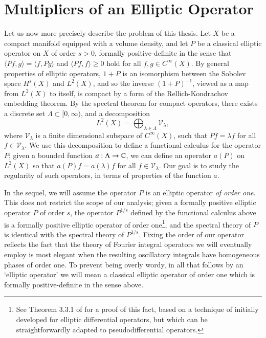 
\chapter{Multipliers of an Elliptic Operator} \label{cha:multipliers_of_an_elliptic_operator}

Let us now more precisely describe the problem of this thesis. Let $X$ be a compact manifold equipped with a volume density, and let $P$ be a classical elliptic operator on $X$ of order $s > 0$, formally positive-definite in the sense that $\langle Pf, g \rangle = \langle f, Pg \rangle$ and $\langle Pf, f \rangle \geq 0$ hold for all $f,g \in C^\infty(X)$. By general properties of elliptic operators, $1 + P$ is an isomorphism between the Sobolev space $H^s(X)$ and $L^2(X)$,
%
%
and so the inverse $(1 + P)^{-1}$, viewed as a map from $L^2(X)$ to itself, is compact by a form of the Rellich-Kondrachov embedding theorem. By the spectral theorem for compact operators, there exists a discrete set $\Lambda \subset [0,\infty)$, and a decomposition
%
\begin{equation}
  L^2(X) = \bigoplus\nolimits_{\lambda \in \Lambda} \mathcal{V}_\lambda,
\end{equation}
%
where $\mathcal{V}_\lambda$ is a finite dimensional subspace of $C^\infty(X)$, such that $Pf = \lambda f$ for all $f \in \mathcal{V}_\lambda$. We use this decomposition to define a functional calculus for the operator $P$; given a bounded function $a: \Lambda \to \operatorname{\mathbb{C}}$, we can define an operator $a(P)$ on $L^2(X)$ so that $a(P) f = a(\lambda) f$ for all $f \in \mathcal{V}_\lambda$. Our goal is to study the regularity of such operators, in terms of properties of the function $a$.

In the sequel, we will assume the operator $P$ is an elliptic operator \emph{of order one}. This does not restrict the scope of our analysis; given a formally positive elliptic operator $P$ of order $s$, the operator $P^{1/s}$ defined by the functional calculus above is a formally positive elliptic operator of order one\footnote{See Theorem 3.3.1 of \cite{Sogge} for a proof of this fact, based on a technique of \cite{Seeley} initially developed for elliptic differential operators, but which can be straightforwardly adapted to pseudodifferential operators.}, and the spectral theory of $P$ is identical with the spectral theory of $P^{1/s}$. Fixing the order of our operator reflects the fact that the theory of Fourier integral operators we will eventually employ is most elegant when the resulting oscillatory integrals have homogeneous phases of order one. To prevent being overly wordy, in all that follows by an `elliptic operator' we will mean a classical elliptic operator of order one which is formally positive-definite in the sense above.

